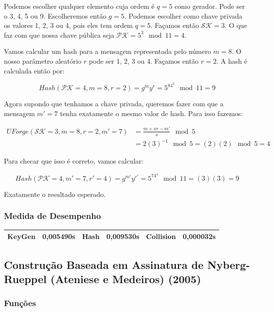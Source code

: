 \documentclass[a4paper]{article}
\begin{document}
Podemos escolher qualquer elemento cuja ordem é $q=5$ como
gerador. Pode ser o 3, 4, 5 ou 9. Escolheremos então $g=5$. Podemos
escolher como chave privada os valores 1, 2, 3 ou 4, pois eles tem
ordem $q=5$. Façamos então $\mathcal{SK}=3$. O que faz com que nossa
chave pública seja $\mathcal{PK}=5^3\mod 11 = 4$.

Vamos calcular um hash para a mensagem representada pelo número
$m=8$. O nosso parâmetro aleatório $r$ pode ser 1, 2, 3 ou 4. Façamos
então $r=2$. A hash é calculada então por:

$$
Hash(\mathcal{PK}=4, m=8, r=2) = g^my^r = 5^84^2 \mod 11 = 9
$$

Agora supondo que tenhamos a chave privada, queremos fazer com que a
mensagem $m'=7$ tenha exatamente o mesmo valor de hash. Para isso
fazemos:

\begin{equation}
\begin{split}
  UForge(\mathcal{SK}=3, m=8, r=2, m'=7) &= \frac{m+xr-m'}{x} \mod 5\\
  &= 2(3)^{-1} \mod 5 = (2)(2) \mod 5 = 4
\end{split}
\end{equation}

Para checar que isso é correto, vamos calcular:

$$ Hash(\mathcal{PK}=4, m'=7, r'=4) = g^{m'}y^{r'} = 5^74^4 \mod 11 =
(3)(3)= 9
$$

Exatamente o resultado esperado.

\subsubsection{Medida de Desempenho}

\begin{center}
\begin{tabular}{|c|c|c|c|c|c|}
  \hline
  KeyGen & 0,005490s & Hash & 0,009530s & Collision & 0,000032s\\
  \hline
\end{tabular}
\end{center}

\subsection{Construção Baseada em Assinatura de Nyberg-Rueppel
  (Ateniese e Medeiros) (2005)\cite{ateniese}}

\subsubsection{Funções}
\end{document}
